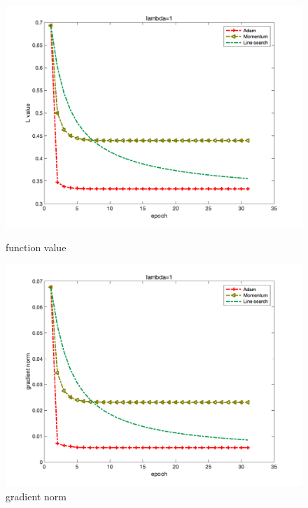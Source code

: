 \documentclass{article}
\begin{document}
\begin{figure}[H]
	\begin{minipage}{0.33\linewidth}
		\centering
		\includegraphics[width=1\linewidth]{./fig/fval_m2}
		\caption{function value}
	\end{minipage}
	\begin{minipage}{0.33\linewidth}
		\centering
		\includegraphics[width=1\linewidth]{./fig/gnorm_m2}
		\caption{gradient norm}
	\end{minipage}
	\begin{minipage}{0.33\linewidth}
		\centering

\end{minipage}
\end{figure}
\end{document}
